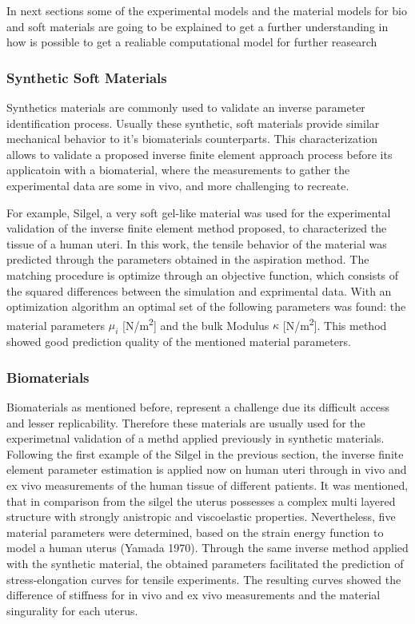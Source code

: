 In next sections some of the experimental models and the material models for bio and soft materials are 
going to be explained to get a further understanding in how is possible to get a realiable computational 
model for further reasearch

\subsubsection*{Synthetic Soft Materials}

Synthetics materials are commonly used to validate an inverse parameter identification process. 
Usually these synthetic, soft materials provide similar mechanical behavior to it's biomaterials 
counterparts. This characterization allows to validate a proposed inverse finite element approach process
before its applicatoin with a biomaterial, where the measurements to gather the experimental data are 
some in vivo, and more challenging to recreate.


For example, Silgel, a very soft gel-like material \cite{Kauer2002} was used for the experimental 
validation of the inverse finite element method proposed, to characterized the tissue of 
a human uteri. In this work, the tensile behavior of the material was predicted through the 
parameters obtained in the aspiration method. The matching procedure is optimize through 
an objective function, which consists of the squared differences between the simulation 
and exprimental data. With an optimization algorithm an optimal set of the following parameters 
was found: the material parameters \(\mu_i\) [N/m\textsuperscript{2}] and the bulk Modulus
\(\kappa\) [N/m\textsuperscript{2}]. This method showed good prediction quality of the mentioned 
material parameters.

\subsubsection*{Biomaterials}
Biomaterials as mentioned before, represent a challenge due its difficult access and lesser replicability.
Therefore these materials are usually used for the experimetnal validation of a methd applied previously in 
synthetic materials. 
 Following the first example of the Silgel in the previous section, the inverse finite element parameter
 estimation is applied now on human uteri \cite{Kauer2002} through in vivo and ex vivo measurements of the human tissue of 
 different patients. It was mentioned, that in comparison from the silgel the uterus possesses a complex 
 multi layered structure with strongly anistropic and viscoelastic properties. Nevertheless, five 
 material parameters were determined, based on the strain energy function to model a human uterus (Yamada 1970).
Through the same inverse method applied with the synthetic material, the obtained parameters facilitated the prediction of stress-elongation curves for tensile experiments. The 
 resulting curves showed the difference of stiffness for in vivo and ex vivo measurements and the material 
 singurality for each uterus.



